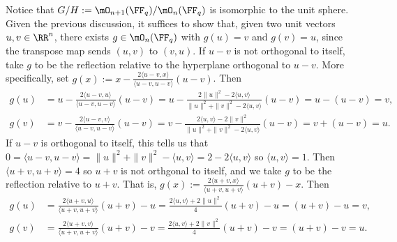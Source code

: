 Notice that $G/H := \mO_{n+1}(\FF_q)/\mO_n(\FF_q)$ is isomorphic to the unit sphere.
Given the previous discussion, it suffices to show that, given two unit vectors $u,v\in\RR^n$, there exists $g\in\mO_n(\FF_q)$ with $g(u) = v$ and $g(v) = u$, since the transpose map sends $(u,v)$ to $(v,u)$.
If $u-v$ is not orthogonal to itself, take $g$ to be the reflection relative to the hyperplane orthogonal to $u-v$.
More specifically, set $g(x) := x - \frac{2\langle u-v,x\rangle}{\langle u-v,u-v\rangle}(u-v)$.
Then
\begin{align*}
    g(u) & = u - \frac{2\langle u-v,u\rangle}{\langle u-v,u-v\rangle}(u-v) = u - \frac{2\|u\|^2-2\langle u,v\rangle}{\|u\|^2+\|v\|^2-2\langle u,v\rangle}(u-v) = u - (u-v) = v, \\
    g(v) & = v - \frac{2\langle u-v,v\rangle}{\langle u-v,u-v\rangle}(u-v) = v - \frac{2\langle u,v\rangle-2\|v\|^2}{\|u\|^2+\|v\|^2-2\langle u,v\rangle}(u-v) = v + (u-v) = u.
\end{align*}
If $u-v$ is orthogonal to itself, this tells us that $0=\langle u-v,u-v\rangle = \|u\|^2+\|v\|^2-\langle u,v\rangle = 2-2\langle u,v\rangle$ so $\langle u,v\rangle = 1$.
Then $\langle u+v,u+v\rangle = 4$ so $u+v$ is not orthgonal to itself, and we take $g$ to be the reflection relative to $u+v$.
That is, $g(x) := \frac{2\langle u+v,x\rangle}{\langle u+v,u+v\rangle}(u+v) - x$.
Then
\begin{align*}
    g(u) & = \frac{2\langle u+v,u\rangle}{\langle u+v,u+v\rangle}(u+v) - u = \frac{2\langle u,v\rangle + 2\|u\|^2}{4}(u+v)-u = (u+v)-u = v, \\
    g(v) & = \frac{2\langle u+v,v\rangle}{\langle u+v,u+v\rangle}(u+v) - v = \frac{2\langle u,v\rangle + 2\|v\|^2}{4}(u+v)-v = (u+v)-v = u.
\end{align*}

